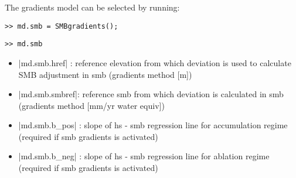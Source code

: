 The gradients model can be selected by running:
\begin{lstlisting}
>> md.smb = SMBgradients();
\end{lstlisting}
\begin{lstlisting}
>> md.smb
\end{lstlisting}
\begin{itemize}
	\item \lstinlinebg|md.smb.href|  : reference elevation from which deviation is used to calculate SMB adjustment in smb (gradients method [m])
	\item \lstinlinebg|md.smb.smbref|: reference smb from which deviation is calculated in smb (gradients method [mm/yr water equiv])
	\item \lstinlinebg|md.smb.b_pos| : slope of hs - smb regression line for accumulation regime (required if smb gradients is activated)
	\item \lstinlinebg|md.smb.b_neg| : slope of hs - smb regression line for ablation regime (required if smb gradients is activated)
\end{itemize}

\clearpage %
